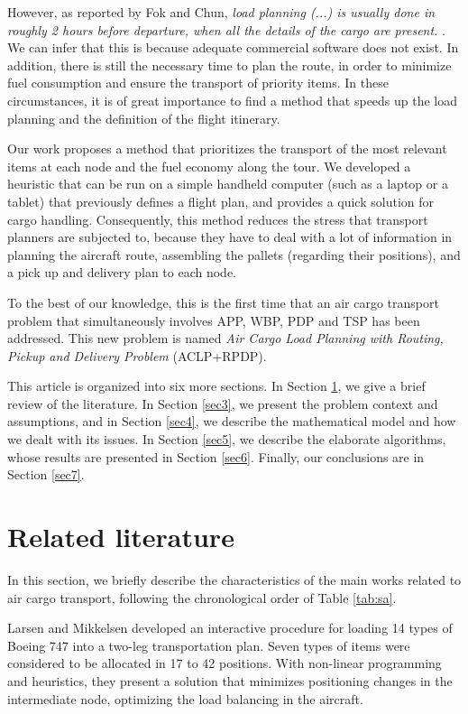 \documentclass[preprint]{elsarticle}
\begin{document}
However, as reported by Fok and Chun, {\it load planning (...) is usually done in roughly 2 hours before departure, when all the details of the cargo are present.} \cite{fok2004optimizing}. We can infer that this is because adequate commercial software does not exist. In addition, there is still the necessary time to plan the route, in order to minimize fuel consumption and ensure the transport of priority items. In these circumstances, it is of great importance to find a method that speeds up the load planning and the definition of the flight itinerary.

Our work proposes a method that prioritizes the transport of the most relevant items at each node and the fuel economy along the tour. We developed a heuristic that can be run on a simple handheld computer (such as a laptop or a tablet) that previously defines a flight plan, and provides a quick solution for cargo handling. Consequently, this method reduces the stress that transport planners are subjected to, because they have to deal with a lot of information in planning the aircraft route, assembling the pallets (regarding their positions), and a pick up and delivery plan to each node.

To the best of our knowledge, this is the first time that an air cargo transport problem that simultaneously involves APP, WBP, PDP and TSP has been addressed. This new problem is named {\it Air Cargo Load Planning with Routing, Pickup and Delivery Problem} (ACLP+RPDP).

This article is organized into six more sections. In Section \ref{sec2}, we give a brief review of the literature. In Section \ref{sec3}, we present the problem context and assumptions, and in Section \ref{sec4}, we describe the mathematical model and how we dealt with its issues. In Section \ref{sec5}, we describe the elaborate algorithms, whose results are presented in Section \ref{sec6}. Finally, our conclusions are in Section \ref{sec7}.

\section{Related literature}
\label{sec2}

In this section, we briefly describe the characteristics of the main works related to air cargo transport, following the chronological order of Table \ref{tab:sa}.

Larsen and Mikkelsen \cite{LarsenMikkelsen1979} developed an interactive procedure for loading 14 types of Boeing 747 into a two-leg transportation plan. Seven types of items were considered to be allocated in 17 to 42 positions. With non-linear programming and heuristics, they present a solution that minimizes positioning changes in the intermediate node, optimizing the load balancing in the aircraft.
\end{document}

